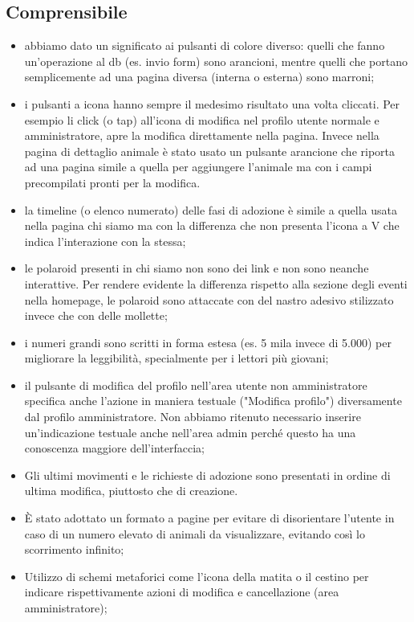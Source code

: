 \subsection{Comprensibile}
\begin{itemize}
    \item abbiamo dato un significato ai pulsanti di colore diverso: quelli che fanno un'operazione al db (es. invio form) sono arancioni, mentre quelli che portano semplicemente ad una pagina diversa (interna o esterna) sono marroni;
    \item i pulsanti a icona hanno sempre il medesimo risultato una volta cliccati. Per esempio li click (o tap) all'icona di modifica nel profilo utente normale e amministratore, apre la modifica direttamente nella pagina. Invece nella pagina di dettaglio animale è stato usato un pulsante arancione che riporta ad una pagina simile a quella per aggiungere l'animale ma con i campi precompilati pronti per la modifica.
    \item la timeline (o elenco numerato) delle fasi di adozione è simile a quella usata nella pagina chi siamo ma con la differenza che non presenta l'icona a V che indica l'interazione con la stessa;
    \item le polaroid presenti in chi siamo non sono dei link e non sono neanche interattive. Per rendere evidente la differenza rispetto alla sezione degli eventi nella homepage, le polaroid sono attaccate con del nastro adesivo stilizzato invece che con delle mollette;
    \item i numeri grandi sono scritti in forma estesa (es. 5 mila invece di 5.000) per migliorare la leggibilità, specialmente per i lettori più giovani;
    \item il pulsante di modifica del profilo nell'area utente non amministratore specifica anche l'azione in maniera testuale ("Modifica profilo") diversamente dal profilo amministratore. Non abbiamo ritenuto necessario inserire un'indicazione testuale anche nell'area admin perché questo ha una conoscenza maggiore dell'interfaccia;
    \item Gli ultimi movimenti e le richieste di adozione sono presentati in ordine di ultima modifica, piuttosto che di creazione.
    \item È stato adottato un formato a pagine per evitare di disorientare l'utente in caso di un numero elevato di animali da visualizzare, evitando così lo scorrimento infinito;
    \item Utilizzo di schemi metaforici come l'icona della matita o il cestino per indicare rispettivamente azioni di modifica e cancellazione (area amministratore);
\end{itemize}
